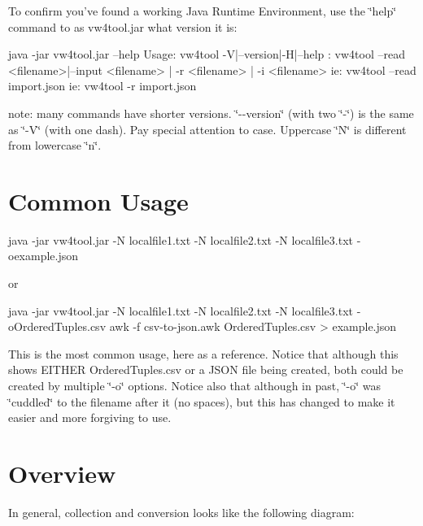 To confirm you've found a working Java Runtime Environment, use the \char`\"{}help\char`\"{} command to as vw4tool.\+jar what version it is\+: \begin{DoxyVerb}java -jar vw4tool.jar --help
Usage: vw4tool -V|--version|-H|--help
     : vw4tool --read <filename>|--input <filename> | -r <filename> | -i <filename>
   ie: vw4tool --read import.json
   ie: vw4tool -r import.json
\end{DoxyVerb}


note\+: many commands have shorter versions. \char`\"{}-\/-\/version\char`\"{} (with two \char`\"{}-\/\char`\"{}) is the same as \char`\"{}-\/\+V\char`\"{} (with one dash). Pay special attention to case. Uppercase \char`\"{}\+N\char`\"{} is different from lowercase \char`\"{}n\char`\"{}.

\section*{Common Usage }

\begin{DoxyVerb}java -jar vw4tool.jar  -N localfile1.txt -N localfile2.txt -N localfile3.txt -oexample.json
\end{DoxyVerb}


or \begin{DoxyVerb}java -jar vw4tool.jar  -N localfile1.txt -N localfile2.txt -N localfile3.txt -oOrderedTuples.csv
awk -f csv-to-json.awk OrderedTuples.csv > example.json
\end{DoxyVerb}


This is the most common usage, here as a reference. Notice that although this shows E\+I\+T\+H\+E\+R Ordered\+Tuples.\+csv or a J\+S\+O\+N file being created, both could be created by multiple \char`\"{}-\/o\char`\"{} options. Notice also that although in past, \char`\"{}-\/o\char`\"{} was \char`\"{}cuddled\char`\"{} to the filename after it (no spaces), but this has changed to make it easier and more forgiving to use.

\section*{Overview }

In general, collection and conversion looks like the following diagram\+:


